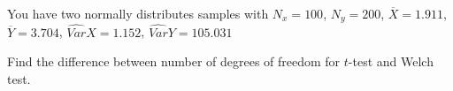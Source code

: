 
\begin{question}
You have two normally distributes samples with \(N_x=100\), \(N_y=200\), \(\overline{X} = 1.911\), \(\overline{Y} = 3.704\), \(\widehat{Var}{X} = 1.152\), \(\widehat{Var}{Y} = 105.031\)

Find the difference between number of degrees of freedom for \(t\)-test and Welch test.
\end{question}


